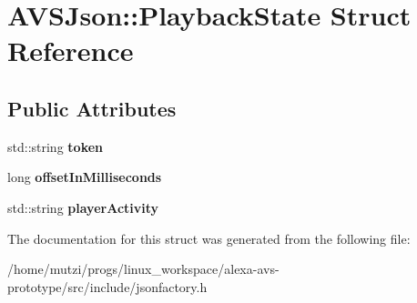 \hypertarget{structAVSJson_1_1PlaybackState}{}\section{A\+V\+S\+Json\+:\+:Playback\+State Struct Reference}
\label{structAVSJson_1_1PlaybackState}
\subsection*{Public Attributes}
\begin{DoxyCompactItemize}
\item 
\mbox{\label{structAVSJson_1_1PlaybackState_ac1305454c79dad90ab57c1e9a7ce9a58}} 
std\+::string {\bfseries token}
\item 
\mbox{\label{structAVSJson_1_1PlaybackState_a55fc2d8f8658eb25e8747efd24ed3de1}} 
long {\bfseries offset\+In\+Milliseconds}
\item 
\mbox{\label{structAVSJson_1_1PlaybackState_a5ded107980d738b144d6233c67a03e5c}} 
std\+::string {\bfseries player\+Activity}
\end{DoxyCompactItemize}


The documentation for this struct was generated from the following file\+:\begin{DoxyCompactItemize}
\item 
/home/mutzi/progs/linux\+\_\+workspace/alexa-\/avs-\/prototype/src/include/jsonfactory.\+h\end{DoxyCompactItemize}
